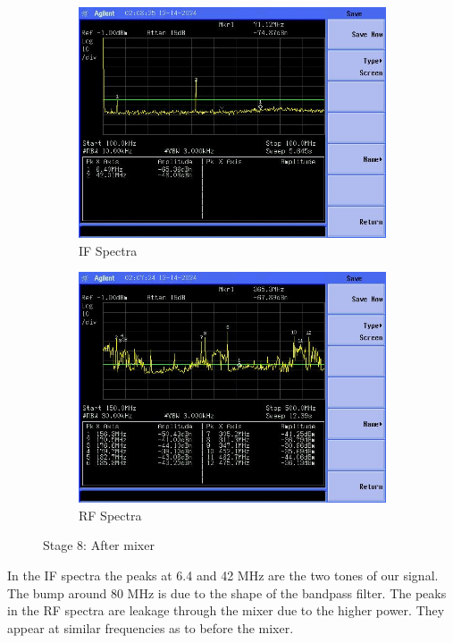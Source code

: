 \documentclass[letterpaper,12pt]{article}
\begin{document}
\begin{figure}[H]
	\begin{subfigure}[t]{.49\textwidth}
		\centering
		\includegraphics[width=\linewidth]{figures/receiver_spectra/8.mixer.lower}
		\caption{IF Spectra}
	  \end{subfigure}
	  \hfill
	  \begin{subfigure}[t]{.49\textwidth}
		\centering
		\includegraphics[width=\linewidth]{figures/receiver_spectra/8.mixer.upper}
		\caption{RF Spectra}
	  \end{subfigure}

	  \vspace{0.5cm}
	  \caption{Stage 8: After mixer}
\end{figure}
In the IF spectra the peaks at 6.4 and 42 MHz are the two tones of our signal. The bump around 80 MHz is due to the shape of the bandpass filter. The peaks in the RF spectra are leakage through the mixer due to the higher power. They appear at similar frequencies as to before the mixer.
\end{document}
